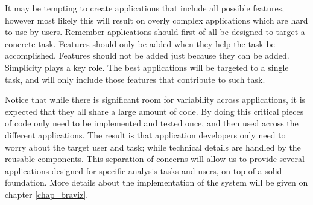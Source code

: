 It may be tempting to create applications that include all possible features, however most likely this will result on overly complex applications which are hard to use by users. Remember applications should first of all be designed to target a concrete task. Features should only be added when they help the task be accomplished. Features should not be added just because they can be added. Simplicity plays a key role. The best applications will be targeted to a single task, and will only include those features that contribute to such task. 

Notice that while there is significant room for variability across applications, it is expected that they all share a large amount of code. By doing this critical pieces of code only need to be implemented and tested once, and then used across the different applications. The result is that application developers only need to worry about the target user and task; while technical details are handled by the reusable components. This separation of concerns will allow us to provide several applications designed for specific analysis tasks and users, on top of a solid foundation. More details about the implementation of the system will be given on chapter \ref{chap_braviz}.


%
%
